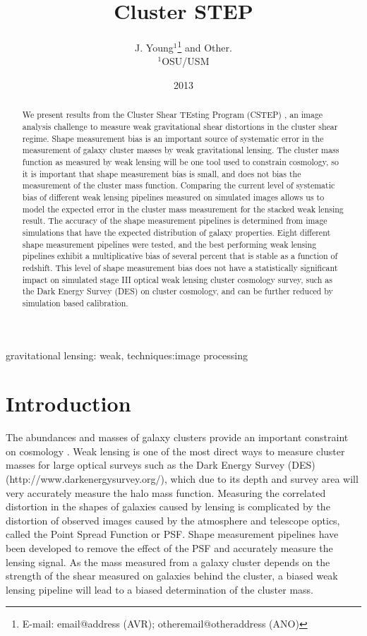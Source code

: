 \documentclass[useAMS,usenatbib]{mn2e}
\title[Cluster Shear TEsting Program]{Cluster STEP}
\author[J. Young and Other]{J. Young$^{1}$\thanks{E-mail:
email@address (AVR); otheremail@otheraddress (ANO)} and 
Other.\\
$^{1}$OSU/USM \\
}
\begin{document}
\date{2013}

\pagerange{\pageref{firstpage}--\pageref{lastpage}} 

\maketitle

\label{firstpage}

\begin{abstract}
We present results from the Cluster Shear TEsting Program (CSTEP) , an image
analysis challenge to measure weak gravitational shear distortions in
the cluster shear regime. Shape measurement bias is an important source of systematic error in the 
measurement of galaxy cluster masses by weak gravitational lensing. The
cluster mass function as measured by weak lensing will be one tool
used to constrain cosmology, so it is important that shape measurement
bias is small, and does not bias the measurement of the cluster mass function. Comparing the current level of systematic bias of different 
weak lensing pipelines measured on simulated images allows us to model the expected error
in the cluster mass measurement for the stacked weak lensing
result. The accuracy of the shape measurement pipelines is determined from image simulations
that have the expected distribution of galaxy properties. Eight 
different shape measurement pipelines were tested, and the best performing weak
lensing pipelines exhibit a multiplicative bias of several percent 
that is stable as a function of redshift. This level of shape measurement bias does not have a statistically
significant impact on simulated stage III optical weak lensing cluster
cosmology survey, such as the Dark Energy Survey (DES) on cluster cosmology, and can be further reduced by simulation based calibration.
\end{abstract}

\begin{keywords}
gravitational lensing: weak, techniques:image processing
\end{keywords}

\section{Introduction}
The abundances and masses of galaxy clusters provide an important constraint on 
cosmology \citep{obscos}. Weak lensing is one of the most direct ways to measure cluster
masses for large optical surveys such as the Dark Energy Survey (DES)
(http://www.darkenergysurvey.org/), which due to its depth and
survey area will very accurately measure the halo mass function.
Measuring the correlated distortion in the shapes of galaxies caused by lensing is complicated
by the distortion of observed images caused by the atmosphere and telescope optics, called the 
Point Spread Function or PSF. Shape measurement pipelines have been developed to remove the 
effect of the PSF and accurately measure the lensing signal. As the
mass measured from a galaxy cluster depends on the strength of the
shear measured on galaxies behind the cluster, a biased weak lensing
pipeline will lead to a biased determination of the cluster mass.
 
\end{document}
